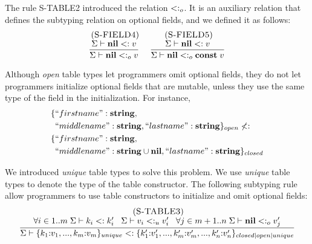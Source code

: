 The rule \textsc{S-TABLE2} introduced the relation $<:_{o}$.
It is an auxiliary relation that defines the subtyping relation
on optional fields, and we defined it as follows:
\[
\begin{array}{c}
\begin{array}{c}
\; (\textsc{S-FIELD4})\\
\dfrac{\Sigma \vdash \mathbf{nil} <: v}
      {\Sigma \vdash \mathbf{nil} <:_{o} v}
\end{array}
\;
\begin{array}{c}
\; (\textsc{S-FIELD5})\\
\dfrac{\Sigma \vdash \mathbf{nil} <: v}
      {\Sigma \vdash \mathbf{nil} <:_{o} \mathbf{const} \; v}
\end{array}
\end{array}
\]

Although \emph{open} table types let programmers omit optional fields,
they do not let programmers initialize optional fields that are
mutable, unless they use the same type of the field in the initialization.
For instance,
\begin{align*}
\{ & ``firstname":\mathbf{string},\\
   & ``middlename":\mathbf{string}, ``lastname":\mathbf{string} \}_{open} \not <: \\
\{ & ``firstname":\mathbf{string}, \\
   & ``middlename":\mathbf{string} \cup \mathbf{nil}, ``lastname":\mathbf{string} \}_{closed}
\end{align*}

We introduced \emph{unique} table types to solve this problem.
We use \emph{unique} table types to denote the type of the
table constructor.
The following subtyping rule allow programmers to use table constructors
to initialize and omit optional fields:
\[
\begin{array}{c}
\; (\textsc{S-TABLE3})\\
\dfrac{\forall i \in 1..m \; \Sigma \vdash k_{i} <: k_{i}' \;\;\;
       \Sigma \vdash v_{i} <:_{u} v_{i}' \;\;\;
       \forall j \in m+1..n \; \Sigma \vdash \mathbf{nil} <:_{o} v_{j}'}
      {\Sigma \vdash \{k_{1}{:}v_{1}, ..., k_{m}{:}v_{m}\}_{unique} <:
                    \{k_{1}'{:}v_{1}', ..., k_{m}'{:}v_{m}', ..., k_{n}'{:}v_{n}'\}_{closed|open|unique}}
\end{array}
\]

